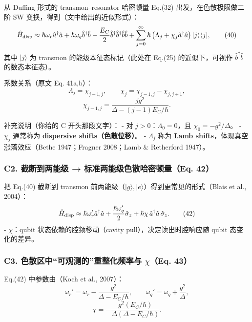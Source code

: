 \documentclass[12pt,a4paper,oneside]{ctexbook}
\begin{document}
从 Duffing 形式的 transmon--resonator 哈密顿量 Eq.(32)
出发，在色散极限做二阶 SW 变换，得到（文中给出的近似形式）： \[
\hat H_{\rm disp}\approx 
\hbar\omega_r\hat a^\dagger\hat a
+\hbar\omega_q\hat b^\dagger\hat b
-\frac{E_C}{2}\hat b^\dagger\hat b^\dagger\hat b\hat b
+\sum_{j=0}^{\infty}\hbar\left(\Lambda_j+\chi_j\hat a^\dagger\hat a\right)|j\rangle\langle j|,
\tag{40}
\] 其中 \(|j\rangle\) 为 transmon 的能级本征态标记（此处在 Eq.(25)
的近似下，可视作 \(\hat b^\dagger\hat b\) 的数态本征态）。

系数关系（原文 Eq. 41a,b）： \[
\Lambda_j=\chi_{j-1,j},
\qquad
\chi_j=\chi_{j-1,j}-\chi_{j,j+1},
\tag{41a}
\] \[
\chi_{j-1,j}=\frac{jg^2}{\Delta-(j-1)E_C/\hbar}.
\tag{41b}
\]

补充说明（你给的 C 开头那段文字）： - 对 \(j>0\)：\(\Lambda_0=0\)，且
\(\chi_0=-g^2/\Delta\)。 - \(\chi_j\) 通常称为 \textbf{dispersive
shifts（色散位移）}。 - \(\Lambda_j\) 称为 \textbf{Lamb
shifts}，体现真空涨落效应（Bethe 1947；Fragner 2008；Lamb \& Retherford
1947）。


\subsubsection{\texorpdfstring{\textbf{C2. 截断到两能级 →
标准两能级色散哈密顿量（Eq.
42）}}{C2. 截断到两能级 → 标准两能级色散哈密顿量（Eq. 42）}}\label{c2.-ux622aux65adux5230ux4e24ux80fdux7ea7-ux6807ux51c6ux4e24ux80fdux7ea7ux8272ux6563ux54c8ux5bc6ux987fux91cfeq.-42}

把 Eq.(40) 截断到 transmon
前两能级（\(|g\rangle,|e\rangle\)）得到更常见的形式（Blais et al.,
2004）： \[
\hat H_{\rm disp}\approx
\hbar\omega_r'\hat a^\dagger\hat a
+\frac{\hbar\omega_q'}{2}\hat\sigma_z
+\hbar\chi\,\hat a^\dagger\hat a\,\hat\sigma_z.
\tag{42}
\] - \(\chi\)：qubit 状态依赖的腔频移动（cavity
pull），决定读出时腔响应随 qubit 态变化的差异。


\subsubsection{\texorpdfstring{\textbf{C3.
色散区中``可观测的''重整化频率与 \(\chi\)（Eq.
43）}}{C3. 色散区中``可观测的''重整化频率与 \textbackslash{}chi（Eq. 43）}}\label{c3.-ux8272ux6563ux533aux4e2dux53efux89c2ux6d4bux7684ux91cdux6574ux5316ux9891ux7387ux4e0e-chieq.-43}

Eq.(42) 中参数由（Koch et al., 2007）： \[
\omega_r'=\omega_r-\frac{g^2}{\Delta-E_C/\hbar},
\qquad
\omega_q'=\omega_q+\frac{g^2}{\Delta},
\tag{43a}
\] \[
\chi=-\frac{g^2(E_C/\hbar)}{\Delta(\Delta-E_C/\hbar)}.
\tag{43b}
\]
\end{document}
